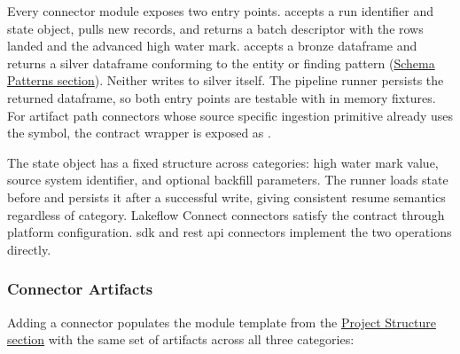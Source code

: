 Every connector module exposes two entry points.  accepts a run identifier and state object, pulls new records, and returns a batch descriptor with the rows landed and the advanced high water mark.  accepts a bronze dataframe and returns a silver dataframe conforming to the entity or finding pattern (\hyperref[sec:schema-patterns]{Schema Patterns section}). Neither writes to silver itself. The pipeline runner persists the returned dataframe, so both entry points are testable with in memory fixtures. For artifact path connectors whose source specific ingestion primitive already uses the  symbol, the contract wrapper is exposed as .

The state object has a fixed structure across categories: high water mark value, source system identifier, and optional backfill parameters. The runner loads state before  and persists it after a successful write, giving consistent resume semantics regardless of category. Lakeflow Connect connectors satisfy the contract through platform configuration. \Gls{sdk} and \gls{rest} \gls{api} connectors implement the two operations directly.

\subsubsection{Connector Artifacts}

Adding a connector populates the module template from the \hyperref[sec:project-structure]{Project Structure section} with the same set of artifacts across all three categories:

